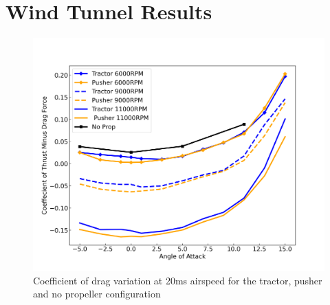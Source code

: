 \graphicspath{{./Appendix/Figs/}}

\cleardoublepage

\chapter{Wind Tunnel Results}
\label{app:wtr}

\begin{figure}[H]
    \centering
    \includegraphics[scale = 0.7]{05_Results/Figs/Cd/10ms_Cd.png}
    \caption{Coefficient of drag variation at 20ms airspeed for the tractor, pusher and no propeller configuration}
    \label{fig:Cd_20ms}
\end{figure}




